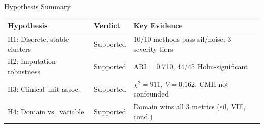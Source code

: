 \documentclass[aspectratio=169, 11pt]{beamer}
\begin{document}
\begin{frame}{Hypothesis Summary}
  \centering
  \begin{tabular}{l l l}
    \toprule
    \textbf{Hypothesis} & \textbf{Verdict} & \textbf{Key Evidence} \\
    \midrule
    H1: Discrete, stable clusters & \textcolor{green!60!black}{Supported} & 10/10 methods pass sil/noise; 3 severity tiers \\
    H2: Imputation robustness & \textcolor{green!60!black}{Supported} & ARI = 0.710, 44/45 Holm-significant \\
    H3: Clinical unit assoc. & \textcolor{green!60!black}{Supported} & $\chi^2 = 911$, $V = 0.162$, CMH not confounded \\
    H4: Domain vs.\ variable & \textcolor{green!60!black}{Supported} & Domain wins all 3 metrics (sil, VIF, cond.) \\
    \bottomrule
  \end{tabular}
\end{frame}
\end{document}
